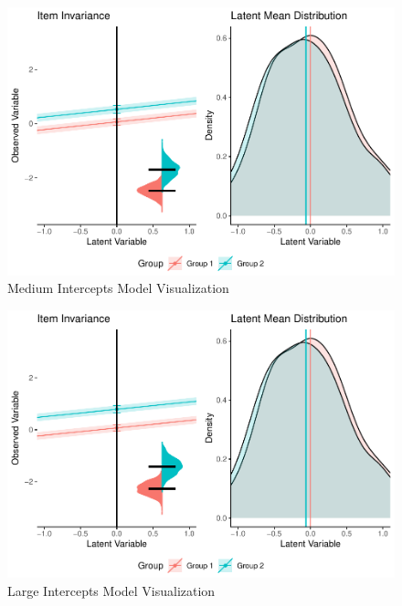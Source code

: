 \documentclass[
  man]{apa7}
\begin{document}
\begin{figure}
\centering
\includegraphics{manuscript_files/figure-latex/med-int-pic-1.pdf}
\caption{\label{fig:med-int-pic}Medium Intercepts Model Visualization}
\end{figure}

\begin{figure}
\centering
\includegraphics{manuscript_files/figure-latex/large-int-pic-1.pdf}
\caption{\label{fig:large-int-pic}Large Intercepts Model Visualization}
\end{figure}
\end{document}
